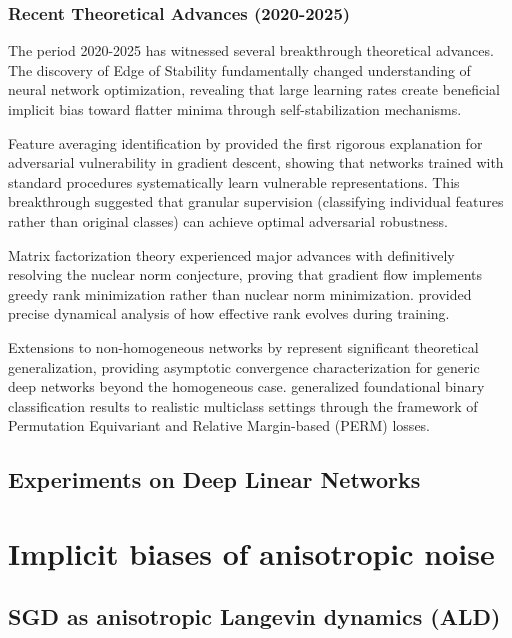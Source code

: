 \documentclass[11pt]{article}
\begin{document}
\subsubsection{Recent Theoretical Advances (2020-2025)}

The period 2020-2025 has witnessed several breakthrough theoretical advances. The discovery of Edge of Stability fundamentally changed understanding of neural network optimization, revealing that large learning rates create beneficial implicit bias toward flatter minima through self-stabilization mechanisms.

Feature averaging identification by \citet{li2024feature} provided the first rigorous explanation for adversarial vulnerability in gradient descent, showing that networks trained with standard procedures systematically learn vulnerable representations. This breakthrough suggested that granular supervision (classifying individual features rather than original classes) can achieve optimal adversarial robustness.

Matrix factorization theory experienced major advances with \citet{li2020towards} definitively resolving the nuclear norm conjecture, proving that gradient flow implements greedy rank minimization rather than nuclear norm minimization. \citet{chou2024gradient} provided precise dynamical analysis of how effective rank evolves during training.

Extensions to non-homogeneous networks by \citet{cai2025implicit} represent significant theoretical generalization, providing asymptotic convergence characterization for generic deep networks beyond the homogeneous case. \citet{ravi2024implicit} generalized foundational binary classification results to realistic multiclass settings through the framework of Permutation Equivariant and Relative Margin-based (PERM) losses.

\subsection{Experiments on Deep Linear Networks}

\section{Implicit biases of anisotropic noise}
\subsection{SGD as anisotropic Langevin dynamics (ALD)}





\end{document}
